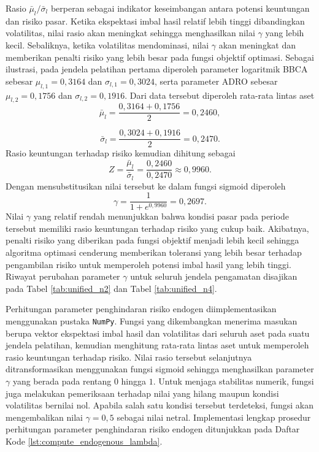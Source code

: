 Rasio $\bar{\mu}_l/\bar{\sigma}_l$ berperan sebagai indikator keseimbangan antara potensi keuntungan dan risiko pasar. Ketika ekspektasi imbal hasil relatif lebih tinggi dibandingkan volatilitas, nilai rasio akan meningkat sehingga menghasilkan nilai $\gamma$ yang lebih kecil. Sebaliknya, ketika volatilitas mendominasi, nilai $\gamma$ akan meningkat dan memberikan penalti risiko yang lebih besar pada fungsi objektif optimasi. Sebagai ilustrasi, pada jendela pelatihan pertama diperoleh parameter logaritmik BBCA sebesar $\mu_{l,1}=0,3164$ dan $\sigma_{l,1}=0,3024$, serta parameter ADRO sebesar $\mu_{l,2}=0,1756$ dan $\sigma_{l,2}=0,1916$. Dari data tersebut diperoleh rata-rata lintas aset
\begin{equation}
\bar{\mu}_l
=
\frac{0,3164+0,1756}{2} =
0,2460,
\end{equation}

\begin{equation}
\bar{\sigma}_l
=
\frac{0,3024+0,1916}{2}
=
0,2470.
\end{equation}
Rasio keuntungan terhadap risiko kemudian dihitung sebagai
\begin{equation}
Z
=
\frac{\bar{\mu}_l}{\bar{\sigma}_l} = \frac{0,2460}{0,2470}
\approx
0,9960.
\end{equation}
Dengan mensubstitusikan nilai tersebut ke dalam fungsi sigmoid diperoleh
\begin{equation}
\gamma
=
\frac{1}{1+e^{0,9960}} =
0,2697.
\end{equation}
Nilai $\gamma$ yang relatif rendah menunjukkan bahwa kondisi pasar pada periode tersebut memiliki rasio keuntungan terhadap risiko yang cukup baik. Akibatnya, penalti risiko yang diberikan pada fungsi objektif menjadi lebih kecil sehingga algoritma optimasi cenderung memberikan toleransi yang lebih besar terhadap pengambilan risiko untuk memperoleh potensi imbal hasil yang lebih tinggi. Riwayat perubahan parameter $\gamma$ untuk seluruh jendela pengamatan disajikan pada Tabel \ref{tab:unified_n2} dan Tabel \ref{tab:unified_n4}.

Perhitungan parameter penghindaran risiko endogen diimplementasikan menggunakan pustaka \texttt{NumPy}. Fungsi yang dikembangkan menerima masukan berupa vektor ekspektasi imbal hasil dan volatilitas dari seluruh aset pada suatu jendela pelatihan, kemudian menghitung rata-rata lintas aset untuk memperoleh rasio keuntungan terhadap risiko. Nilai rasio tersebut selanjutnya ditransformasikan menggunakan fungsi sigmoid sehingga menghasilkan parameter $\gamma$ yang berada pada rentang $0$ hingga $1$. Untuk menjaga stabilitas numerik, fungsi juga melakukan pemeriksaan terhadap nilai yang hilang maupun kondisi volatilitas bernilai nol. Apabila salah satu kondisi tersebut terdeteksi, fungsi akan mengembalikan nilai $\gamma=0,5$ sebagai nilai netral. Implementasi lengkap prosedur perhitungan parameter penghindaran risiko endogen ditunjukkan pada Daftar Kode \ref{lst:compute_endogenous_lambda}.


